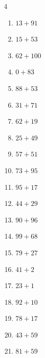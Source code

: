 \begin{multicols}{4}
\begin{enumerate}
  \item $13+91$
        \phantom{$=104$}

  \item $15+53$
        \phantom{$=68$}

  \item $62+100$
        \phantom{$=162$}

  \item $0+83$
        \phantom{$=83$}

\columnbreak %

  \item $88+53$
        \phantom{$=141$}

  \item $31+71$
        \phantom{$=102$}

  \item $62+19$
        \phantom{$=81$}

  \item $25+49$
        \phantom{$=74$}

  \item $57+51$
        \phantom{$=108$}

  \item $73+95$
        \phantom{$=168$}

  \item $95+17$
        \phantom{$=112$}

  \item $44+29$
        \phantom{$=73$}

  \item $90+96$
        \phantom{$=186$}

  \item $99+68$
        \phantom{$=167$}

  \item $79+27$
        \phantom{$=106$}

  \item $41+2$
        \phantom{$=43$}

  \item $23+1$
        \phantom{$=24$}

  \item $92+10$
        \phantom{$=102$}

  \item $78+17$
        \phantom{$=95$}

  \item $43+59$
        \phantom{$=102$}

  \item $81+59$
        \phantom{$=140$}


\end{enumerate}
\end{multicols}
